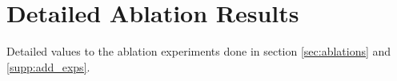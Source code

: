 \documentclass{article} \usepackage{arxiv_style,times}
\begin{document}
 
 
\begin{table}[ht!]
\centering
\caption{Additional ProxyAnchor \citep{kim2020proxy} results with and without \textit{S2SD} variants using the proposed, but different, default architecture in \citep{kim2020proxy} to highlight that \textit{S2SD} works equally well on already strong proxy-based objectives objectives with different architectural settings as well.}
\centering
{}
\label{tab:proxyanchor_results}
\end{table} 
\section{Detailed Ablation Results}\label{supp:detailed_2}
Detailed values to the ablation experiments done in section \ref{sec:ablations} and \ref{supp:add_exps}.






 
 
\end{document}
